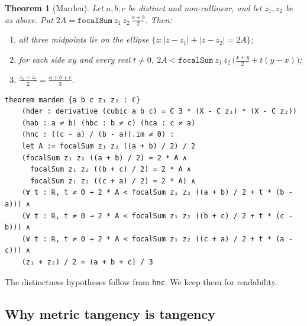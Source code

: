 \documentclass[11pt]{article}
\newtheorem{theorem}{Theorem}
\theoremstyle{remark}
\newcommand{\lean}[1]{\texttt{#1}}
\begin{document}
\begin{theorem}[Marden]\label{thm:marden}
Let $a,b,c$ be distinct and non-collinear, and let $z_1,z_2$ be as above. Put
$2A=\lean{focalSum}\ z_1\,z_2\,\frac{a+b}2$. Then:
\begin{enumerate}
\item[(i)] all three midpoints lie on the ellipse $\{z:|z-z_1|+|z-z_2|=2A\}$;
\item[(ii)] for each side $xy$ and every real $t\ne0$,
$2A<\lean{focalSum}\ z_1\,z_2\,\bigl(\frac{x+y}2+t(y-x)\bigr)$;
\item[(iii)] $\frac{z_1+z_2}2=\frac{a+b+c}3$.
\end{enumerate}
\end{theorem}

\begin{lstlisting}
theorem marden {a b c z₁ z₂ : ℂ}
    (hder : derivative (cubic a b c) = C 3 * (X - C z₁) * (X - C z₂))
    (hab : a ≠ b) (hbc : b ≠ c) (hca : c ≠ a)
    (hnc : ((c - a) / (b - a)).im ≠ 0) :
    let A := focalSum z₁ z₂ ((a + b) / 2) / 2
    (focalSum z₁ z₂ ((a + b) / 2) = 2 * A ∧
      focalSum z₁ z₂ ((b + c) / 2) = 2 * A ∧
      focalSum z₁ z₂ ((c + a) / 2) = 2 * A) ∧
    (∀ t : ℝ, t ≠ 0 → 2 * A < focalSum z₁ z₂ ((a + b) / 2 + t * (b - a))) ∧
    (∀ t : ℝ, t ≠ 0 → 2 * A < focalSum z₁ z₂ ((b + c) / 2 + t * (c - b))) ∧
    (∀ t : ℝ, t ≠ 0 → 2 * A < focalSum z₁ z₂ ((c + a) / 2 + t * (a - c))) ∧
    (z₁ + z₂) / 2 = (a + b + c) / 3
\end{lstlisting}

The distinctness hypotheses follow from \lean{hnc}. We keep them for readability.

\subsection{Why metric tangency is tangency}\label{sec:metrictan}
\end{document}
